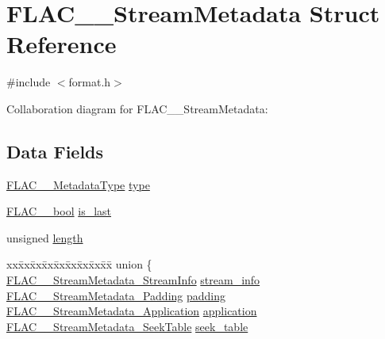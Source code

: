 \hypertarget{struct_f_l_a_c_____stream_metadata}{}\section{F\+L\+A\+C\+\_\+\+\_\+\+Stream\+Metadata Struct Reference}
\label{struct_f_l_a_c_____stream_metadata}


{\ttfamily \#include $<$format.\+h$>$}



Collaboration diagram for F\+L\+A\+C\+\_\+\+\_\+\+Stream\+Metadata\+:
\subsection*{Data Fields}
\begin{DoxyCompactItemize}
\item 
\hyperlink{group__flac__format_gac71714ba8ddbbd66d26bb78a427fac01}{F\+L\+A\+C\+\_\+\+\_\+\+Metadata\+Type} \hyperlink{struct_f_l_a_c_____stream_metadata_a39fd0655464f2cc7c9c37ae715088aec}{type}
\item 
\hyperlink{ordinals_8h_a95103469f1cbd78b8cf250194985b34e}{F\+L\+A\+C\+\_\+\+\_\+bool} \hyperlink{struct_f_l_a_c_____stream_metadata_aef40bbf85abe12e035f66f2d54ed316c}{is\+\_\+last}
\item 
unsigned \hyperlink{struct_f_l_a_c_____stream_metadata_a3fd615e41609837a5672f9081d9d2183}{length}
\item 
\begin{tabbing}
xx\=xx\=xx\=xx\=xx\=xx\=xx\=xx\=xx\=\kill
union \{\\
\>\hyperlink{struct_f_l_a_c_____stream_metadata___stream_info}{FLAC\_\_StreamMetadata\_StreamInfo} \hyperlink{struct_f_l_a_c_____stream_metadata_a827c8671721b01ed3007adbe81ae0c6b}{stream\_info}\\
\>\hyperlink{struct_f_l_a_c_____stream_metadata___padding}{FLAC\_\_StreamMetadata\_Padding} \hyperlink{struct_f_l_a_c_____stream_metadata_a202f0ed2fa1dae32893be6025838f651}{padding}\\
\>\hyperlink{struct_f_l_a_c_____stream_metadata___application}{FLAC\_\_StreamMetadata\_Application} \hyperlink{struct_f_l_a_c_____stream_metadata_af16b029d4a476aeb46f9a215e2cce462}{application}\\
\>\hyperlink{struct_f_l_a_c_____stream_metadata___seek_table}{FLAC\_\_StreamMetadata\_SeekTable} \hyperlink{struct_f_l_a_c_____stream_metadata_a3d27e525001843d173f8c97987663aa7}{seek\_table}\\

\end{tabbing}
\end{DoxyCompactItemize}
